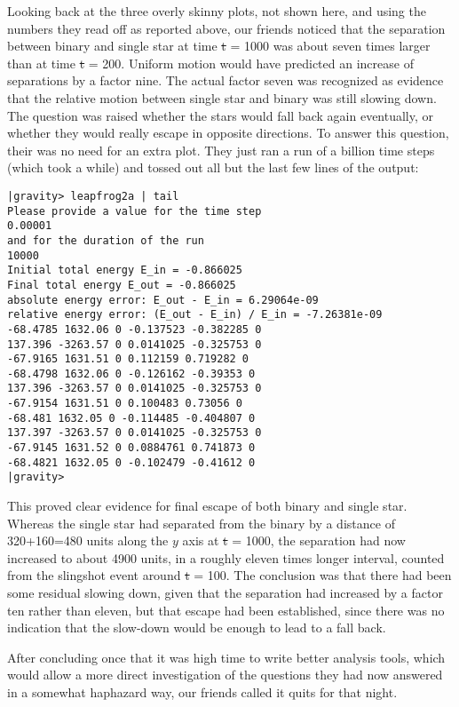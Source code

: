 Looking back at the three overly skinny plots, not shown here, and
using the numbers they read off as reported above, our friends noticed
that the separation between binary and single star at time {\st t = 1000}
was about seven times larger than at time {\st t = 200}.  Uniform motion
would have predicted an increase of separations by a factor nine.  The
actual factor seven was recognized as evidence that the relative
motion between single star and binary was still slowing down.  The
question was raised whether the stars would fall back again eventually,
or whether they would really escape in opposite directions.  To answer
this question, their was no need for an extra plot.  They just ran a
run of a billion time steps (which took a while) and tossed out all but
the last few lines of the output:

\begin{small}
\begin{verbatim}
|gravity> leapfrog2a | tail
Please provide a value for the time step
0.00001
and for the duration of the run
10000
Initial total energy E_in = -0.866025
Final total energy E_out = -0.866025
absolute energy error: E_out - E_in = 6.29064e-09
relative energy error: (E_out - E_in) / E_in = -7.26381e-09
-68.4785 1632.06 0 -0.137523 -0.382285 0 
137.396 -3263.57 0 0.0141025 -0.325753 0 
-67.9165 1631.51 0 0.112159 0.719282 0 
-68.4798 1632.06 0 -0.126162 -0.39353 0 
137.396 -3263.57 0 0.0141025 -0.325753 0 
-67.9154 1631.51 0 0.100483 0.73056 0 
-68.481 1632.05 0 -0.114485 -0.404807 0 
137.397 -3263.57 0 0.0141025 -0.325753 0 
-67.9145 1631.52 0 0.0884761 0.741873 0 
-68.4821 1632.05 0 -0.102479 -0.41612 0 
|gravity>
\end{verbatim}
\end{small}

This proved clear evidence for final escape of both binary and single
star.  Whereas the single star had separated from the binary by a
distance of 320+160=480 units along the $y$ axis at {\st t = 1000},
the separation had now increased to about 4900 units, in a roughly
eleven times longer interval, counted from the slingshot event around
{\st t = 100}.  The conclusion was that there had been some residual
slowing down, given that the separation had increased by a factor ten
rather than eleven, but that escape had been established, since there
was no indication that the slow-down would be enough to lead to a fall
back.

After concluding once that it was high time to write better analysis
tools, which would allow a more direct investigation of the questions
they had now answered in a somewhat haphazard way, our friends called
it quits for that night.

